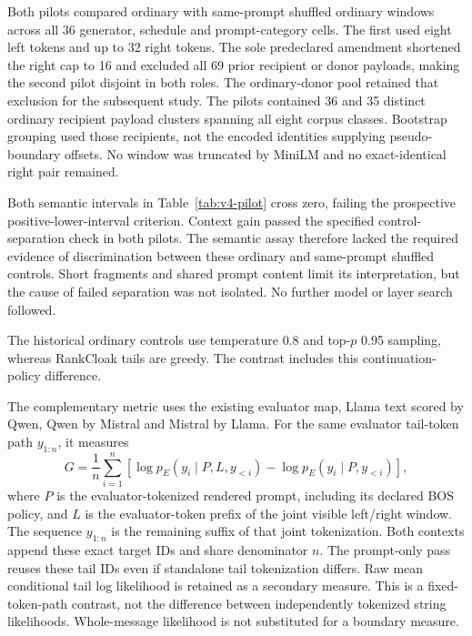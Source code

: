 Both pilots compared ordinary with same-prompt shuffled ordinary windows across all 36 generator, schedule and prompt-category cells. The first used eight left tokens and up to 32 right tokens. The sole predeclared amendment shortened the right cap to 16 and excluded all 69 prior recipient or donor payloads, making the second pilot disjoint in both roles. The ordinary-donor pool retained that exclusion for the subsequent study. The pilots contained 36 and 35 distinct ordinary recipient payload clusters spanning all eight corpus classes. Bootstrap grouping used those recipients, not the encoded identities supplying pseudo-boundary offsets. No window was truncated by MiniLM and no exact-identical right pair remained.

Both semantic intervals in Table~\ref{tab:v4-pilot} cross zero, failing the prospective positive-lower-interval criterion. Context gain passed the specified control-separation check in both pilots. The semantic assay therefore lacked the required evidence of discrimination between these ordinary and same-prompt shuffled controls. Short fragments and shared prompt content limit its interpretation, but the cause of failed separation was not isolated. No further model or layer search followed.



The historical ordinary controls use temperature 0.8 and top-\(p\) 0.95 sampling, whereas RankCloak tails are greedy. The contrast includes this continuation-policy difference.

The complementary metric uses the existing evaluator map, Llama text scored by Qwen, Qwen by Mistral and Mistral by Llama. For the same evaluator tail-token path \(y_{1:n}\), it measures
\begin{equation}
G=\frac{1}{n}\sum_{i=1}^{n}\left[\log p_E(y_i\mid P,L,y_{<i})-\log p_E(y_i\mid P,y_{<i})\right],
\label{eq:v4-context-gain}
\end{equation}
where \(P\) is the evaluator-tokenized rendered prompt, including its declared BOS policy, and \(L\) is the evaluator-token prefix of the joint visible left/right window. The sequence \(y_{1:n}\) is the remaining suffix of that joint tokenization. Both contexts append these exact target IDs and share denominator \(n\). The prompt-only pass reuses these tail IDs even if standalone tail tokenization differs. Raw mean conditional tail log likelihood is retained as a secondary measure. This is a fixed-token-path contrast, not the difference between independently tokenized string likelihoods. Whole-message likelihood is not substituted for a boundary measure.

